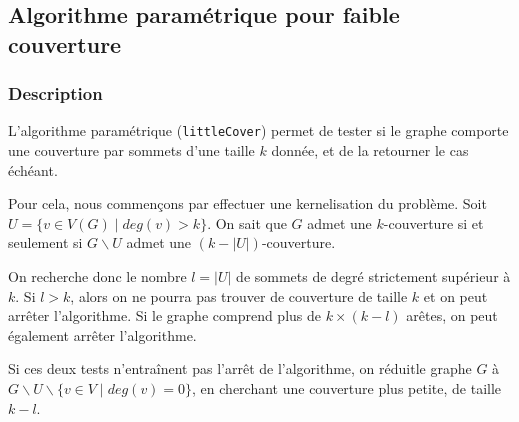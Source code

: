\documentclass[a4paper,10pt]{article}
\begin{document}
\subsection{Algorithme paramétrique pour faible couverture}

\subsubsection{Description}

L'algorithme paramétrique (\texttt{littleCover}) permet de tester si le graphe comporte une couverture par sommets d'une taille $k$ donnée, et de la retourner le cas échéant.

\bigskip
Pour cela, nous commençons par effectuer une kernelisation du problème. Soit $U = \{ v \in V(G) \mid deg(v) > k\}$. On sait que $G$ admet une $k$-couverture si et seulement si $G \smallsetminus U$ admet une $(k - |U|)$-couverture.

On recherche donc le nombre $l = |U|$ de sommets de degré strictement supérieur à $k$. 
Si $l > k$, alors on ne pourra pas trouver de couverture de taille $k$ et on peut arrêter l'algorithme.
Si le graphe comprend plus de $k\times(k-l)$ arêtes, on peut également arrêter l'algorithme.

Si ces deux tests n'entraînent pas l'arrêt de l'algorithme, on \og réduit\fg le graphe $G$ à $G \smallsetminus U \smallsetminus \{v \in V \mid deg(v) = 0\}$, en cherchant une couverture plus petite, de taille $k-l$.
\end{document}
